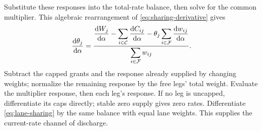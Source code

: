 \documentclass[10pt,a4paper]{article}
\newcommand{\rev}[1]{{\color{revisionred}#1}}
\begin{document}
Substitute these responses into the total-rate balance, then solve for
the common multiplier.
\rev{This algebraic rearrangement of \eqref{eq:sharing-derivative} gives}
\begin{equation}
 \frac{\mathrm d\theta_j}{\mathrm d\alpha}
 =\frac{\displaystyle
 \frac{\mathrm dW_j}{\mathrm d\alpha}
 -\sum_{i\in{\cal C}}\frac{\mathrm dC_{ij}}{\mathrm d\alpha}
 -\theta_j\sum_{i\in{\cal F}}\frac{\mathrm dw_{ij}}{\mathrm d\alpha}}
 {\displaystyle\sum_{i\in{\cal F}}w_{ij}}.
 \label{eq:sharing-level-derivative}
\end{equation}
Subtract the capped grants and the response already supplied by changing
weights; normalize the remaining response by the free legs' total weight.
Evaluate the multiplier response, then each leg's response. If no leg is
uncapped, differentiate its caps directly; stable zero supply gives zero
rates. Differentiate \eqref{eq:lane-sharing} by the same balance with
equal lane weights. This supplies the current-rate channel of discharge.
\end{document}
